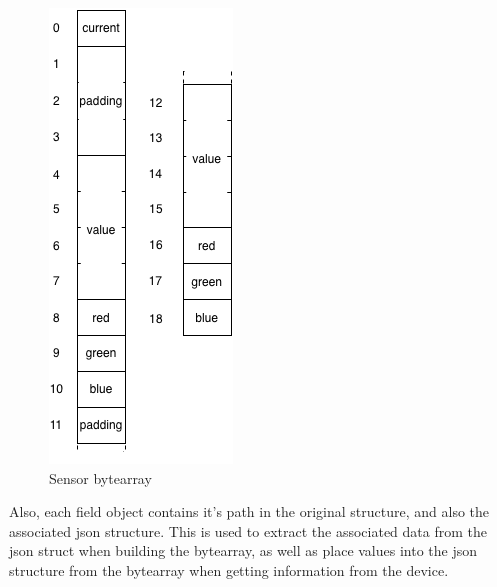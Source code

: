 \documentclass[12pt]{article}
\begin{document}
\begin{figure}[htbp] %
   \centering
   \includegraphics[]{sensor_bytearray.png} 
\caption{Sensor bytearray}
\label{fig:sensorbytearray}
\end{figure}


Also, each field object contains it's path in the original
structure, and also the associated json structure. This is used to
extract the associated data from the json struct when building the
bytearray, as well as place values into the json structure from the
bytearray when getting information from the device.



\end{document}
